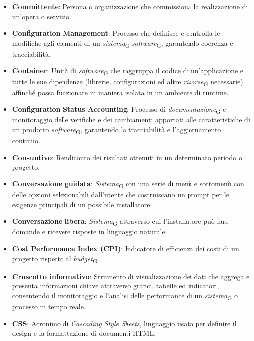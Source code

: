 \begin{itemize}
    \item \textbf{Committente}: Persona o organizzazione che commissiona la realizzazione di un'opera o servizio.
    \item \textbf{Configuration Management}: Processo che definisce e controlla le modifiche agli elementi di un \textit{sistema}\textsubscript{G} \textit{software}\textsubscript{G}, garantendo coerenza e tracciabilità.
    \item \textbf{Container}: Unità di \textit{software}\textsubscript{G} che raggruppa il codice di un'applicazione e tutte le sue dipendenze (librerie, configurazioni ed altre \textit{risorse}\textsubscript{G} necessarie) affinché possa funzionare in maniera isolata in un ambiente di runtime.
    \item \textbf{Configuration Status Accounting}: Processo di \textit{documentazione}\textsubscript{G} e monitoraggio delle verifiche e dei cambiamenti apportati alle caratteristiche di un prodotto \textit{software}\textsubscript{G}, garantendo la tracciabilità e l'aggiornamento continuo.
    \item \textbf{Consuntivo}: Rendiconto dei risultati ottenuti in un determinato periodo o progetto.
    \item \textbf{Conversazione guidata}: \textit{Sistema}\textsubscript{G} con una serie di menù e sottomenù con delle opzioni selezionabili dall’utente che costruiscano un prompt per le esigenze principali di un possibile installatore.
    \item \textbf{Conversazione libera}: \textit{Sistema}\textsubscript{G} attraverso cui l’installatore può fare domande e ricevere risposte in linguaggio naturale.
    \item \textbf{Cost Performance Index (CPI)}: Indicatore di efficienza dei costi di un progetto rispetto al \textit{budget}\textsubscript{G}.
    \item \textbf{Cruscotto informativo}: Strumento di visualizzazione dei dati che aggrega e presenta informazioni chiave attraverso grafici, tabelle ed indicatori, consentendo il monitoraggio e l'analisi delle performance di un \textit{sistema}\textsubscript{G} o processo in tempo reale.
    \item \textbf{CSS}: Acronimo di \textit{Cascading Style Sheets}, linguaggio usato per definire il design e la formattazione di documenti HTML.
    
\end{itemize}
